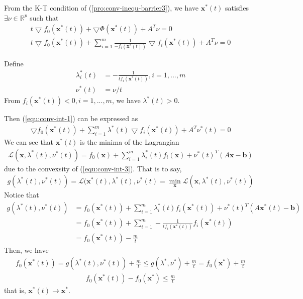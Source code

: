 From the K-T condition of (\ref{pro:conv-inequ-barrier3}),
we have $\mathbf{x}^*(t)$ satisfies $\exists \nu \in \mathbb{R}^p$ such that
\begin{align}
    t \bigtriangledown f_0(\mathbf{x}^*(t)) + \bigtriangledown \Phi(\mathbf{x}^*(t))
    + A^T \nu = 0 \\
    t \bigtriangledown f_0(\mathbf{x}^*(t)) + \sum_{i=1}^m
    \frac{1}{-f_i(\mathbf{x}^*(t))} \bigtriangledown f_i(\mathbf{x}^*(t))
    + A^T \nu = 0
    \label{equ:conv-int-1}
\end{align}
\par
Define
\begin{align}
    \lambda^*_i(t) &= -\frac{1}{tf_i(\mathbf{x}^*(t))}, i = 1, ..., m \\
    \nu^*(t) &= \nu/t
\end{align}
From $f_i(\mathbf{x}^*(t)) < 0, i = 1,..., m$, we have
$\lambda^*(t) > 0$.
\par
Then (\ref{equ:conv-int-1}) can be expressed as
\begin{align}
    \bigtriangledown f_0(\mathbf{x}^*(t)) + \sum_{i=1}^m
    \lambda^*(t) \bigtriangledown f_i(\mathbf{x}^*(t))
    + A^T \nu^*(t) = 0
    \label{equ:conv-int-2}
\end{align}
We can see that $\mathbf{x}^*(t)$ is the minima of the Lagrangian
\begin{align}
    \mathcal{L}(\mathbf{x}, \lambda^*(t), \nu^*(t)) = 
    f_0(\mathbf{x}) + \sum_{i=1}^m \lambda_i^*(t) f_i(\mathbf{x}) + \nu^*(t)^T(A\mathbf{x} - \mathbf{b})
    \label{equ:conv-int-3}
\end{align}
due to the convexsity of (\ref{equ:conv-int-3}).
That is to say,
\begin{align}
    g(\lambda^*(t), \nu^*(t)) =
    \mathcal{L}(\mathbf{x}^*(t), \lambda^*(t), \nu^*(t) =
    \min_{\mathbf{x}}
    \mathcal{L}(\mathbf{x}, \lambda^*(t), \nu^*(t))
\end{align}
Notice that
\begin{align}
    g(\lambda^*(t), \nu^*(t)) &= 
    f_0(\mathbf{x}^*(t)) + \sum_{i=1}^m \lambda_i^*(t)
    f_i(\mathbf{x}^*(t)) + \nu^*(t)^T(A\mathbf{x}^*(t) - \mathbf{b}) \\
    &= f_0(\mathbf{x}^*(t)) + \sum_{i=1}^m -\frac{1}{tf_i(\mathbf{x}^*(t))}
    f_i(\mathbf{x}^*(t)) \\
    &=f_0(\mathbf{x}^*(t)) - \frac{m}{t}
\end{align}
Then, we have
\begin{align}
    f_0(\mathbf{x}^*(t)) = g(\lambda^*(t), \nu^*(t))
    + \frac{m}{t} \leq g(\lambda^*, \nu^*) + \frac{m}{t}
    = f_0(\mathbf{x}^*) + \frac{m}{t}
\end{align}
\begin{align}
    f_0(\mathbf{x}^*(t)) - f_0(\mathbf{x}^*) \leq \frac{m}{t}
\end{align}
that is, $\mathbf{x}^*(t) \rightarrow \mathbf{x}^*$. 

